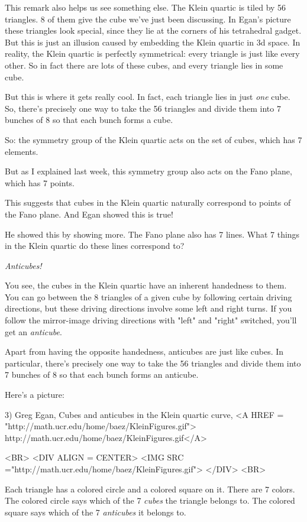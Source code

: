 This remark also helps us see something else.  The Klein quartic is
tiled by 56 triangles.  8 of them give the cube we've just been 
discussing.  In Egan's picture these triangles look special, since 
they lie at the corners of his tetrahedral gadget.  But this is
just an illusion caused by embedding the Klein quartic in 3d space.  
In reality, the Klein quartic is perfectly symmetrical: every 
triangle is just like every other.  So in fact there are lots of 
these cubes, and every triangle lies in some cube.

But this is where it gets really cool.  In fact, each triangle lies
in just \emph{one} cube.  So, there's precisely one way to take the 56 
triangles and divide them into 7 bunches of 8 so that each bunch forms 
a cube.   

So: the symmetry group of the Klein quartic acts on the set of cubes,
which has 7 elements.

But as I explained last week, this symmetry group also acts on the 
Fano plane, which has 7 points.

This suggests that cubes in the Klein quartic naturally correspond 
to points of the Fano plane.  And Egan showed this is true!

He showed this by showing more.  The Fano plane also has 7 lines.
What 7 things in the Klein quartic do these lines correspond to?

\emph{Anticubes!}

You see, the cubes in the Klein quartic have an inherent handedness
to them.  You can go between the 8 triangles of a given cube by 
following certain driving directions, but these driving directions 
involve some left and right turns.  If you follow the mirror-image
driving directions with "left" and "right" switched, 
you'll get an \emph{anticube}.
 
Apart from having the opposite handedness, anticubes are just like
cubes.  In particular, there's precisely one way to take the 56 
triangles and divide them into 7 bunches of 8 so that each bunch forms 
an anticube.

Here's a picture:

3) Greg Egan, Cubes and anticubes in the Klein quartic curve,
<A HREF = "http://math.ucr.edu/home/baez/KleinFigures.gif">
http://math.ucr.edu/home/baez/KleinFigures.gif</A>

<BR>
<DIV ALIGN = CENTER>
<IMG SRC ="http://math.ucr.edu/home/baez/KleinFigures.gif">
</DIV>
<BR>

Each triangle has a colored circle and a colored square on it.
There are 7 colors.  The colored circle says which of the 7 \emph{cubes}
the triangle belongs to.  The colored square says which of the 7
\emph{anticubes} it belongs to.  

